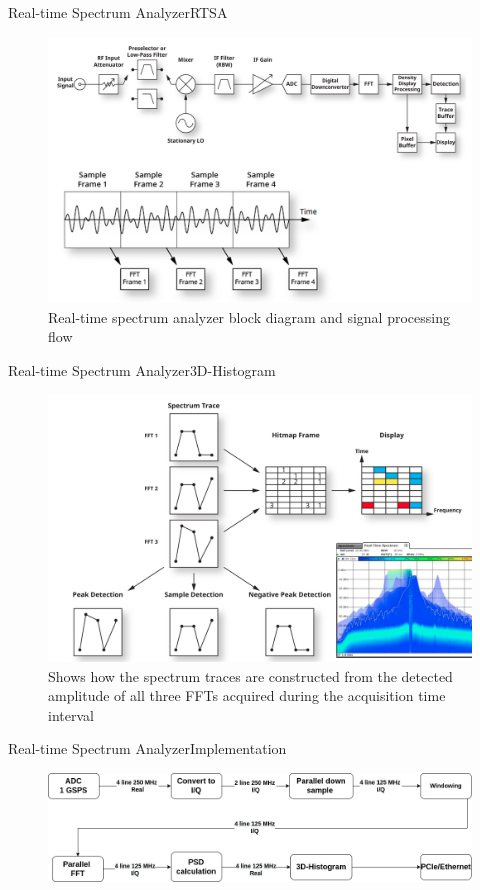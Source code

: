 \begin{frame}{Real-time Spectrum Analyzer}{RTSA}
	\begin{figure}
		\centering
		\includegraphics[scale=0.7]{graphics/rtsa_fig3.png}
		\caption{Real-time spectrum analyzer block diagram and signal processing flow}
	\end{figure}
\end{frame}
\begin{frame}{Real-time Spectrum Analyzer}{3D-Histogram}
	\begin{figure}
		\centering
		\includegraphics[scale=0.85]{graphics/rtsa_fig4.png}
		\caption{Shows how the spectrum traces are constructed from the detected
			amplitude of all three FFTs acquired during the acquisition time interval}
	\end{figure}
\end{frame}
\begin{frame}{Real-time Spectrum Analyzer}{Implementation}
	\begin{figure}
		\centering
		\includegraphics[scale=0.3]{graphics/rtsa_fig5.png}
	\end{figure}
\end{frame}







